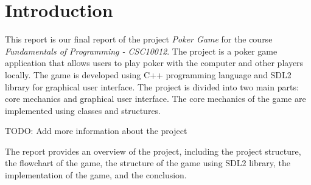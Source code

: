 \section{Introduction}
\label{sec:introduction}

\hspace{1cm} This report is our final report of the project \textit{Poker Game} for the course \textit{Fundamentals of Programming - CSC10012}. The project is a poker game application that allows users to play poker with the computer and other players locally. The game is developed using C++ programming language and SDL2 library for graphical user interface. The project is divided into two main parts: core mechanics and graphical user interface. The core mechanics of the game are implemented using classes and structures.

\vspace{0.5cm}

\hspace{1cm} TODO: Add more information about the project

\vspace{0.5cm}

\hspace{1cm} The report provides an overview of the project, including the project structure, the flowchart of the game, the structure of the game using SDL2 library, the implementation of the game, and the conclusion.

